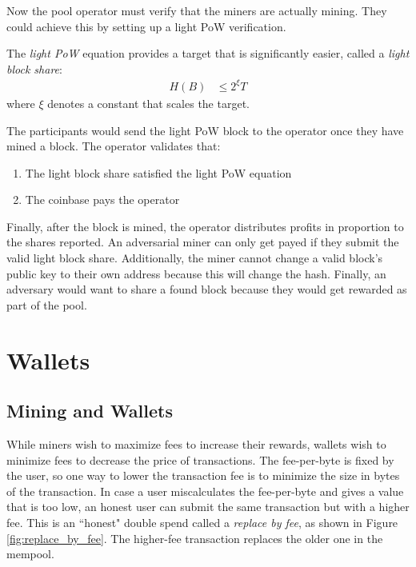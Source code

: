 Now the pool operator must verify that the miners are actually mining. They could achieve this by setting up a light PoW verification.
\begin{definition}
The \textit{light PoW} equation provides a target that is significantly easier, called a \textit{light block share}:
\begin{align*}
H(B) &\leq 2^\xi T
\end{align*}
where $\xi$ denotes a constant that scales the target.
\end{definition}
The participants would send the light PoW block to the operator once they have mined a block. The operator validates that:
\begin{enumerate}
    \item The light block share satisfied the light PoW equation
    \item The coinbase pays the operator\end{enumerate}

Finally, after the block is mined, the operator distributes profits in proportion to the shares reported. An adversarial miner can only get payed if they submit the valid light block share. Additionally, the miner cannot change a valid block's public key to their own address because this will change the hash. Finally, an adversary would want to share a found block because they would get rewarded as part of the pool.

\section{Wallets}

\subsection{Mining and Wallets}
While miners wish to maximize fees to increase their rewards, wallets wish to minimize fees to decrease the price of transactions. The fee-per-byte is fixed by the user, so one way to lower the transaction fee is to minimize the size in bytes of the transaction. In case a user miscalculates the fee-per-byte and gives a value that is too low, an honest user can submit the same transaction but with a higher fee. This is an ``honest" double spend called a \textit{replace by fee}, as shown in Figure \ref{fig:replace_by_fee}. The higher-fee transaction replaces the older one in the mempool.

